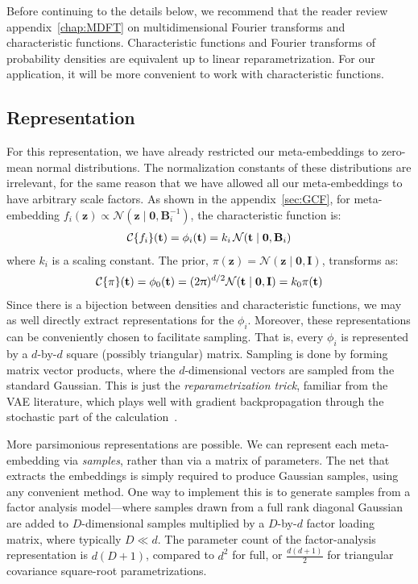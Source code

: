 \documentclass[a4paper,oneside,12pt,english]{report}
\def\zvec{\mathbf{z}}
\def\ND{\mathcal{N}}
\def\Bmat{\mathbf{B}}
\def\Imat{\mathbf{I}}
\def\nulvec{\boldsymbol{0}}
\def\Cset{\mathcal{C}}
\newcommand\CT[2][]{\Cset_{#1}\{#2\}}
\begin{document}
Before continuing to the details below, we recommend that the reader review appendix~\ref{chap:MDFT} on multidimensional Fourier transforms and characteristic functions. Characteristic functions and Fourier transforms of probability densities are equivalent up to linear reparametrization. For our application, it will be more convenient to work with characteristic functions.

\subsection{Representation}
For this representation, we have already restricted our meta-embeddings to zero-mean normal distributions. The normalization constants of these distributions are irrelevant, for the same reason that we have allowed all our meta-embeddings to have arbitrary scale factors. As shown in the appendix~\ref{sec:GCF}, for meta-embedding $f_i(\zvec)\propto\ND(\zvec\mid\nulvec,\Bmat_i^{-1})$, the characteristic function is:
\begin{align}
\CT{f_i}(\tvec) = \phi_i(\tvec) = k_i\,\ND(\tvec\mid\nulvec,\Bmat_i)
\end{align} 
where $k_i$ is a scaling constant. The prior, $\pi(\zvec)=\ND(\zvec\mid\nulvec,\Imat)$, transforms as:
\begin{align}
\CT{\pi}(\tvec) = \phi_0(\tvec) = (2\uppi)^{d/2} \ND(\tvec\mid\nulvec,\Imat) = k_0\pi(\tvec)
\end{align} 
Since there is a bijection between densities and characteristic functions, we may as well directly extract representations for the $\phi_i$. Moreover, these representations can be conveniently chosen to facilitate sampling. That is, every $\phi_i$ is represented by a $d$-by-$d$ square (possibly triangular) matrix. Sampling is done by forming matrix vector products, where the $d$-dimensional vectors are sampled from the standard Gaussian. This is just the \emph{reparametrization trick}, familiar from the VAE literature, which plays well with gradient backpropagation through the stochastic part of the calculation~\cite{VAE}. 

More parsimonious representations are possible. We can represent each meta-embedding via \emph{samples}, rather than via a matrix of parameters. The net that extracts the embeddings is simply required to produce Gaussian samples, using any convenient method. One way to implement this is to generate samples from a factor analysis model---where samples drawn from a full rank diagonal Gaussian are added to $D$-dimensional samples multiplied by a $D$-by-$d$ factor loading matrix, where typically $D\ll d$. The parameter count of the factor-analysis representation  is $d(D+1)$, compared to $d^2$ for full, or $\frac{d(d+1)}{2}$ for triangular covariance square-root parametrizations.
\end{document}

